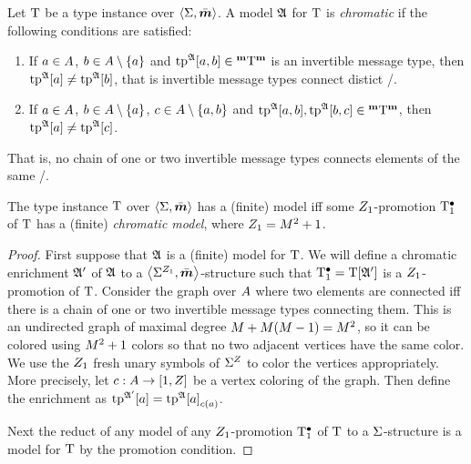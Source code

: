 \begin{definition}
Let $\mathrm{T}$ be a type instance over $\left\langle \mathrm{\Sigma},\bar{\bm{m}} \right\rangle$.
A model $\mathfrak{A}$ for $\mathrm{T}$ is \emph{chromatic}
if the following conditions are satisfied:
\begin{enumerate}
  \item If $a\in A$, $b\in A\setminus\left\{a\right\}$ and
  $\operatorname{tp}^{\mathfrak{A}}[a,b]\in{{}^{\bm{\mathrm{m}}}{\mathrm{T}}^{\bm{\mathrm{m}}}}$ is an invertible message type,
  then $\operatorname{tp}^{\mathfrak{A}}[a]\neq\operatorname{tp}^{\mathfrak{A}}[b]$, that is invertible message types
  connect distict \onetypes/.
  \item If $a\in A$, $b\in A\setminus\left\{a\right\}$,
  $c\in A\setminus\left\{a,b\right\}$ and $\operatorname{tp}^{\mathfrak{A}}[a,b], 
  \operatorname{tp}^{\mathfrak{A}}[b,c]\in{{}^{\bm{\mathrm{m}}}{\mathrm{T}}^{\bm{\mathrm{m}}}}$, then $\operatorname{tp}^{\mathfrak{A}}[a]\neq\operatorname{tp}^{\mathfrak{A}}[c]$.
\end{enumerate}
That is, no chain of one or two invertible message types connects elements of
the same \onetype/.
\end{definition}
\begin{remark}[Chromaticity]\label{rem:prop-chroma}
The type instance $\mathrm{T}$ over $\left\langle \mathrm{\Sigma},\bar{\bm{m}} \right\rangle$ has a (finite) model
iff some $Z_{1}$-promotion $\mathrm{T}_{1}^{\bullet}$ of $\mathrm{T}$ has a (finite)
\emph{chromatic model}, where $Z_{1} = M^2+1$.
\end{remark}
\begin{proof}
First suppose that $\mathfrak{A}$ is a (finite) model for $\mathrm{T}$.
We will define a chromatic enrichment $\mathfrak{A'}$ of $\mathfrak{A}$ to a
$\left\langle {\mathrm{\Sigma}}^{Z_{1}},\bar{\bm{m}} \right\rangle$-structure such that $\mathrm{T}_{1}^{\bullet} = \mathrm{T}[\mathfrak{A'}]$ is a
$Z_{1}$-promotion of $\mathrm{T}$.
Consider the graph over $A$ where two elements are connected iff there is a
chain of one or two invertible message types connecting them.
This is an undirected graph of maximal degree $M+M(M-1)=M^2$, so it can
be colored using $M^2+1$ colors so that no two adjacent vertices have the same
color. We use the $Z_{1}$ fresh unary symbols of ${\mathrm{\Sigma}}^{Z}$ to color the
vertices appropriately. More precisely, let $c : A\to[1,Z]$ be a vertex
coloring of the graph. Then define the enrichment as
$\operatorname{tp}^{\mathfrak{A'}}[a] = {\operatorname{tp}^{\mathfrak{A}}[a]}_{c(a)}$.

Next the reduct of any model of any $Z_{1}$-promotion $\mathrm{T}_{1}^{\bullet}$ of $\mathrm{T}$ to a
$\mathrm{\Sigma}$-structure is a model for $\mathrm{T}$ by the promotion condition.
\end{proof}

